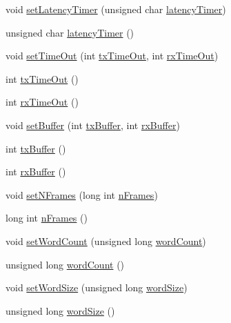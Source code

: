 \begin{DoxyCompactItemize}
\item 
void \hyperlink{classUsbFTInterface_abe0147f74ac414d0bd2cb4a7a81024b9}{set\+Latency\+Timer} (unsigned char \hyperlink{classUsbFTInterface_a4fa70ce4a4cd4f8f01cdeb4835f11276}{latency\+Timer})
\item 
unsigned char \hyperlink{classUsbFTInterface_a4fa70ce4a4cd4f8f01cdeb4835f11276}{latency\+Timer} ()
\item 
void \hyperlink{classUsbFTInterface_a62d90f80a81d1decd66f9b9f10cb8dc6}{set\+Time\+Out} (int \hyperlink{classUsbFTInterface_acab2397cb42003a1ed8f69a0c6cae195}{tx\+Time\+Out}, int \hyperlink{classUsbFTInterface_ad95ffb87539ca86882e26fa24b00de97}{rx\+Time\+Out})
\item 
int \hyperlink{classUsbFTInterface_acab2397cb42003a1ed8f69a0c6cae195}{tx\+Time\+Out} ()
\item 
int \hyperlink{classUsbFTInterface_ad95ffb87539ca86882e26fa24b00de97}{rx\+Time\+Out} ()
\item 
void \hyperlink{classUsbFTInterface_aaa09fdc28deb45d0a65f5d42c06dd659}{set\+Buffer} (int \hyperlink{classUsbFTInterface_acac73d3fc1587437656bb7fe24e10906}{tx\+Buffer}, int \hyperlink{classUsbFTInterface_a836d1a8d181fd49e11235bb677e3fa7e}{rx\+Buffer})
\item 
int \hyperlink{classUsbFTInterface_acac73d3fc1587437656bb7fe24e10906}{tx\+Buffer} ()
\item 
int \hyperlink{classUsbFTInterface_a836d1a8d181fd49e11235bb677e3fa7e}{rx\+Buffer} ()
\item 
void \hyperlink{classUsbFTInterface_a247a19741032fa0f330cc3f6c17ed08b}{set\+N\+Frames} (long int \hyperlink{classUsbFTInterface_a694f5cb1d38d4369a597ad6761762c0e}{n\+Frames})
\item 
long int \hyperlink{classUsbFTInterface_a694f5cb1d38d4369a597ad6761762c0e}{n\+Frames} ()
\item 
void \hyperlink{classUsbFTInterface_a8251b4faa76c380ea41d795482532e30}{set\+Word\+Count} (unsigned long \hyperlink{classUsbFTInterface_a2acaf55e8c253f20e1f25a023c9238f4}{word\+Count})
\item 
unsigned long \hyperlink{classUsbFTInterface_a2acaf55e8c253f20e1f25a023c9238f4}{word\+Count} ()
\item 
void \hyperlink{classUsbFTInterface_a1666f09d2b8994f8d13d6bc66f43b530}{set\+Word\+Size} (unsigned long \hyperlink{classUsbFTInterface_add098ede127a2089e3ac8ea615ed6d46}{word\+Size})
\item 
unsigned long \hyperlink{classUsbFTInterface_add098ede127a2089e3ac8ea615ed6d46}{word\+Size} ()

\end{DoxyCompactItemize}
